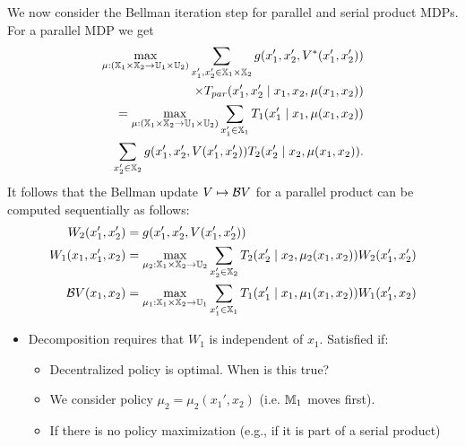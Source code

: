 \documentclass[conference]{IEEEtran}
\newcommand{\red}[1]{{\color{red} #1 }}
\begin{document}
We now consider the Bellman iteration step for parallel and serial product MDPs. For a parallel MDP we get
\begin{equation*}
\begin{aligned}
  \max_{\mu: (\mathbb{X}_1 \times \mathbb{X}_2 \rightarrow \mathbb{U}_1 \times \mathbb{U}_2)} \sum_{x_1', x_2' \in \mathbb{X}_1 \times \mathbb{X}_2}  g(x_1', x_2', V^*(x_1', x_2')) \\
  \times T_{par}(x_1', x_2' \mid x_1, x_2, \mu(x_1, x_2)) \\
  = \max_{\mu: (\mathbb{X}_1 \times \mathbb{X}_2 \rightarrow \mathbb{U}_1 \times \mathbb{U}_2)} \sum_{x_1' \in \mathbb{X}_1} T_1(x_1' \mid x_1, \mu(x_1, x_2)) \\
    \sum_{x_2' \in \mathbb{X}_2}  g(x_1', x_2', V(x_1', x_2')) T_2(x_2' \mid x_2, \mu(x_1, x_2)).
\end{aligned}
\end{equation*}
It follows that the Bellman update $V \mapsto \mathcal{B} V$ for a parallel product can be computed sequentially as follows:
\begin{equation}
\begin{aligned}
  W_2(x_1', x_2') &= g(x_1', x_2', V(x_1', x_2')) \\
  W_1(x_1, x_1', x_2) &= \max_{\mu_2: \mathbb{X}_1 \times \mathbb{X}_2 \rightarrow \mathbb{U}_2} \sum_{x_2' \in \mathbb{X}_2}  T_2(x_2' \mid x_2, \mu_2(x_1, x_2)) W_2(x_1', x_2')  \\
  \mathcal{B} V(x_1, x_2) &= \max_{\mu_1: \mathbb{X}_1 \times \mathbb{X}_2 \rightarrow \mathbb{U}_1}  \sum_{x_1' \in \mathbb{X}_1}  T_1(x_1' \mid x_1, \mu_1(x_1, x_2)) W_1(x_1', x_2)
\end{aligned}
\end{equation}

\red{
\begin{itemize}
  \item Decomposition requires that $W_1$ is independent of $x_1$. Satisfied if:
  \begin{itemize}
    \item Decentralized policy is optimal. When is this true?
    \item We consider policy $\mu_2 = \mu_2(x_1', x_2)$ (i.e. $\mathbb{M}_1$ moves first).
    \item If there is no policy maximization (e.g., if it is part of a serial product)
  \end{itemize}
\end{itemize}

}
\end{document}
